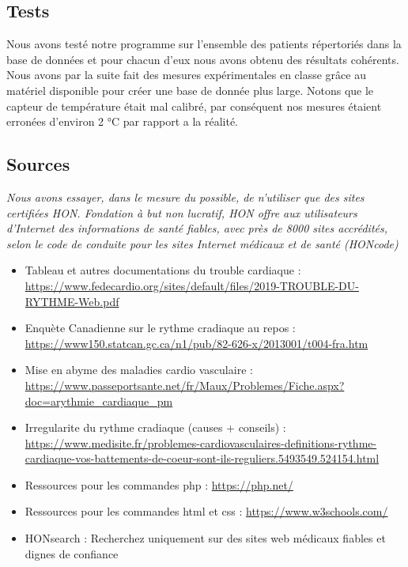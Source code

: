     \subsection{Tests}
Nous avons testé notre programme sur l'ensemble des patients répertoriés dans la base de données et pour chacun d'eux nous avons obtenu des résultats cohérents. \\
Nous avons par la suite fait des mesures expérimentales en classe grâce au matériel disponible pour créer une base de donnée plus large. Notons que le capteur de température était mal calibré, par conséquent nos mesures étaient erronées d'environ 2 °C par rapport a la réalité.


	\subsection{Sources}
\textit{Nous avons essayer, dans le mesure du possible, de n'utiliser que des sites certifiées HON. Fondation à but non lucratif, HON offre aux utilisateurs d’Internet des informations de santé fiables, avec près de 8000 sites accrédités, selon le code de conduite pour les sites Internet médicaux et de santé (HONcode)}
\begin{itemize}
\item Tableau et autres documentations du trouble cardiaque :       \textcolor{blue}{\url{https://www.fedecardio.org/sites/default/files/2019-TROUBLE-DU-RYTHME-Web.pdf}}
\item Enquète Canadienne sur le rythme cradiaque au repos : \textcolor{blue}{\url{https://www150.statcan.gc.ca/n1/pub/82-626-x/2013001/t004-fra.htm}}
\item Mise en abyme des maladies cardio vasculaire : \textcolor{blue}{\url{https://www.passeportsante.net/fr/Maux/Problemes/Fiche.aspx?doc=arythmie_cardiaque_pm}}
\item Irregularite du rythme cradiaque (causes + conseils) : \textcolor{blue}{\url{https://www.medisite.fr/problemes-cardiovasculaires-definitions-rythme-cardiaque-vos-battements-de-coeur-sont-ils-reguliers.5493549.524154.html}}
\item Ressources pour les commandes php : \textcolor{blue}{\url{https://php.net/}}
\item Ressources pour les commandes html et css : \textcolor{blue}{\url{https://www.w3schools.com/}}
\item HONsearch : Recherchez uniquement sur des sites web médicaux fiables et dignes de confiance
\end{itemize}
